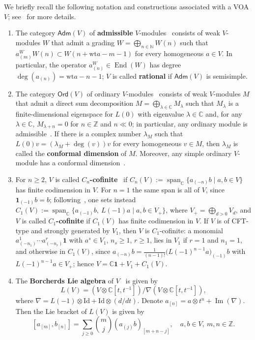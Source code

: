 \documentclass[12pt,a4paper,reqno]{amsart}
\numberwithin{equation}{section}
\theoremstyle{definition}
\newcommand{\End}{\operatorname{End}}
\newcommand{\im}{\operatorname{Im}}
\newcommand{\C}{\mathbb{C}}
\newcommand{\N}{\mathbb{N}}
\newcommand{\Z}{\mathbb{Z}}
\def\Ord{\mathsf{Ord}}
\def\Adm{\mathsf{Adm}}
\def\la{\lambda}
\def\vac{\mathbf{1}}
\def\o{\otimes}
\def\wt{\mathrm{wt}}
\def\Id{\mathrm{Id}}
\begin{document}
We briefly recall the following notation and constructions associated with a VOA $V$; see~\cite{borcherds86,FZ92,FHL93,DLM,zhu1996modular} for more details.
\begin{enumerate}
\item The category $\Adm(V)$ of \textbf{admissible} $V$-modules~\cite[Definition 2.3]{DLM2} consists of weak $V$-modules $W$ that admit a grading $W = \bigoplus_{n \in \N} W(n)$ such that $a^W_{(m)} W(n) \subset W(n+\wt a - m -1)$ for every homogeneous $a\in V$. In particular, the operator $a^W_{(n)}\in \End(W)$ has degree $\deg(a_{(n)})=\wt a-n-1$; $V$ is called \textbf{rational} if $\Adm(V)$ is semisimple.
\item The category $\Ord(V)$ of ordinary $V$-modules~\cite[Definition 2.1]{DLM2} consists of weak $V$-modules $M$ that admit a direct sum decomposition $M=\bigoplus_{\la\in \C} M_\la$ such that $M_\la$ is a finite-dimensional eigenspace for $L(0)$ with eigenvalue $\la\in \C$ and, for any $\la\in \C$, $M_{\la+n}=0$ for $n\in \Z$ and $n\ll0$; in particular, any ordinary module is admissible~\cite[Remark 2.4]{DLM2}. If there is a complex number $\la_M$ such that $L(0)v = (\la_M + \deg (v)) v$ for every homogeneous $v \in M$, then $\la_M$ is called the \textbf{conformal dimension} of $M$. Moreover, any simple ordinary $V$-module has a conformal dimension~\cite[p.128]{FZ92}.
\item For $n\geq 2$, $V$ is called \textbf{$C_n$-cofinite}~\cite[p.10]{Li1999} if $C_n(V):=\operatorname{span}_\C\{a_{(-n)}b\mid a,b\in V\}$ has finite codimension in $V$. For $n=1$ the same span is all of $V$, since $\vac_{(-1)}b=b$; following~\cite{KarelLi99}, one sets instead $C_1(V):=\operatorname{span}_\C\{a_{(-1)}b,\ L(-1)a\mid a,b\in V_+\}$, where $V_+=\bigoplus_{d>0}V_d$, and $V$ is called \textbf{$C_1$-cofinite} if $C_1(V)$ has finite codimension in $V$. If $V$ is of CFT-type and strongly generated by $V_1$, then $V$ is $C_1$-cofinite: a monomial $a^1_{(-n_1)}\cdots a^r_{(-n_r)}\vac$ with $a^s\in V_1$, $n_s\geq 1$, $r\geq 1$, lies in $V_1$ if $r=1$ and $n_1=1$, and otherwise in $C_1(V)$, since $a_{(-n)}b=\frac{1}{(n-1)!}\big(L(-1)^{n-1}a\big)_{(-1)}b$ with $L(-1)^{n-1}a\in V_+$; hence $V=\C\vac+V_1+C_1(V)$.
\item The \textbf{Borcherds Lie algebra} of $V$~\cite[Section 8]{borcherds86} is given by
\[	L(V)=(V\o \C[t,t^{-1}])/\nabla (V\o \C[t,t^{-1}]),\]
	where $\nabla =L(-1)\o \Id+\Id\o (d/dt)$. Denote $a_{[n]}=a\o t^n+\im(\nabla)$. Then the Lie bracket of $L(V)$ is given by
    \[
    	[a_{[m]},b_{[n]}]=\sum_{j\geq0} \binom{m}{j} (a_{(j)}b)_{[m+n-j]},\quad a,b\in V,\ m,n\in \Z.
\]
\end{enumerate}
\end{document}
